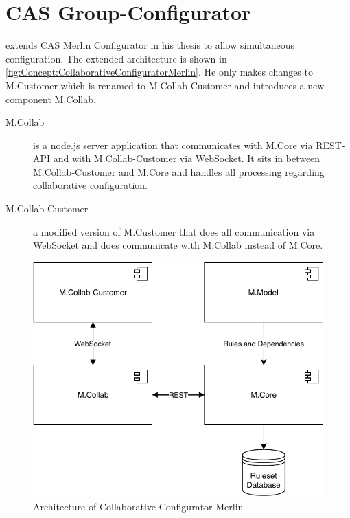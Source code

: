 \section{CAS Group-Configurator}
\label{sec:Concept:GroupConfigurator}

\citeauthor{raabKollaborativeProduktkonfigurationEchtzeit2019} extends CAS Merlin Configurator in his thesis to allow simultaneous configuration. The extended architecture is shown in \autoref{fig:Concept:CollaborativeConfiguratorMerlin}.
He only makes changes to M.Customer which is renamed to M.Collab-Customer and introduces a new component M.Collab.

\begin{description}
    \item[M.Collab] is a node.js server application that communicates with M.Core via REST-API and with M.Collab-Customer via WebSocket. It sits in between M.Collab-Customer and M.Core and handles all processing regarding collaborative configuration.
    \item[M.Collab-Customer] a modified version of M.Customer that does all communication via WebSocket and does communicate with M.Collab instead of M.Core.
\end{description}

\begin{figure}
    \centering
    \includegraphics{./figures/40_concept/MerlinCollaborativeConfigurator.pdf}
    \caption{Architecture of Collaborative Configurator Merlin \cite[Fig. 4.3]{raabKollaborativeProduktkonfigurationEchtzeit2019}}
    \label{fig:Concept:CollaborativeConfiguratorMerlin}
\end{figure}



